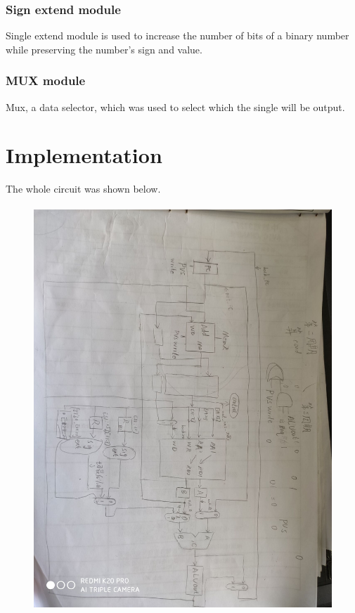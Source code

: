 \documentclass[12pt,a4paper]{article}
\begin{document}
\subsubsection{Sign extend module}

Single extend module is used to increase the number of bits of a binary number while preserving the number's sign and value. 

\subsubsection{MUX module}

Mux, a data selector, which was used to select which the single will be output.

\newpage

\section{Implementation}

The whole circuit was shown below.

\begin{figure}[H]
  \centering
  \includegraphics[height=6in, angle=90]{Lens.jpg}
  \end{figure}
\end{document}

